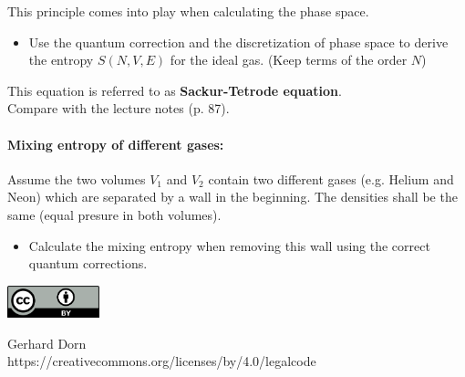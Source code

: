 \documentclass[12pt,a4paper]{article} %
\begin{document}
This principle comes into play when calculating the phase space.
\begin{itemize}
 \item Use the quantum correction and the discretization of phase space to derive the entropy $S(N,V,E)$ for the ideal gas. (Keep terms of the order $N$)
\end{itemize}
 This equation is referred to as \textbf{Sackur-Tetrode equation}.\\
Compare with the lecture notes (p. 87).\\[1cm]

\paragraph{Mixing entropy of different gases:} Assume the two volumes $V_1$ and $V_2$ contain two different gases (e.g. Helium and Neon) which are separated by a wall in the beginning. The densities shall be the same (equal presure in both volumes).
\begin{itemize}
 \item Calculate the mixing entropy when removing this wall using the correct quantum corrections.
\end{itemize}




 
 
 
 
 
 \vspace{2cm}
 \begin{minipage}[t]{1\textwidth}
 	\raggedleft
 	\centering
 	\includegraphics[width = 0.20\textwidth]{CC-BY_icon}
 	\vspace{0.2cm}
 	
 	\centering
 	{\Large Gerhard Dorn} \\
 	https://creativecommons.org/licenses/by/4.0/legalcode
 \end{minipage}


  
\end{document}
